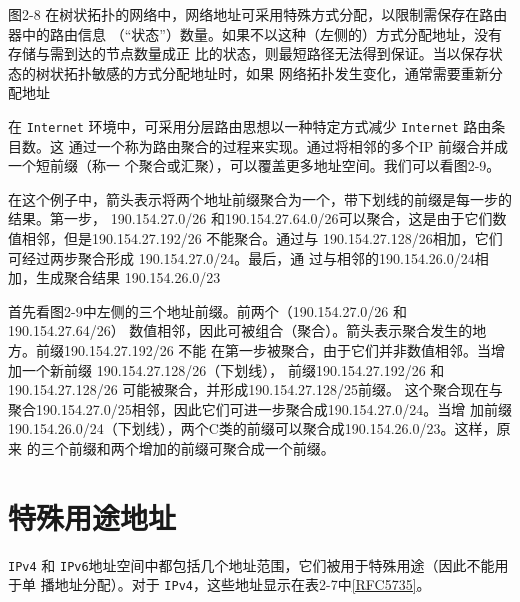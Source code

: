 图2-8 在树状拓扑的网络中，网络地址可采用特殊方式分配，以限制需保存在路由器中的路由信息
（“状态”）数量。如果不以这种（左侧的）方式分配地址，没有存储与需到达的节点数量成正
比的状态，则最短路径无法得到保证。当以保存状态的树状拓扑敏感的方式分配地址时，如果
网络拓扑发生变化，通常需要重新分配地址

在 \verb|Internet| 环境中，可采用分层路由思想以一种特定方式减少 \verb|Internet| 路由条目数。这
通过一个称为路由聚合的过程来实现。通过将相邻的多个IP 前缀合并成一个短前缀（称一
个聚合或汇聚），可以覆盖更多地址空间。我们可以看图2-9。

在这个例子中，箭头表示将两个地址前缀聚合为一个，带下划线的前缀是每一步的结果。第一步，
190.154.27.0/26 和190.154.27.64.0/26可以聚合，这是由于它们数值相邻，但是190.154.27.192/26
不能聚合。通过与 190.154.27.128/26相加，它们可经过两步聚合形成 190.154.27.0/24。最后，通
过与相邻的190.154.26.0/24相加，生成聚合结果 190.154.26.0/23

首先看图2-9中左侧的三个地址前缀。前两个（190.154.27.0/26 和 190.154.27.64/26）
数值相邻，因此可被组合（聚合）。箭头表示聚合发生的地方。前缀190.154.27.192/26 不能
在第一步被聚合，由于它们并非数值相邻。当增加一个新前缀 190.154.27.128/26（下划线），
前缀190.154.27.192/26 和190.154.27.128/26 可能被聚合，并形成190.154.27.128/25前缀。
这个聚合现在与聚合190.154.27.0/25相邻，因此它们可进一步聚合成190.154.27.0/24。当增
加前缀190.154.26.0/24（下划线），两个C类的前缀可以聚合成190.154.26.0/23。这样，原来
的三个前缀和两个增加的前缀可聚合成一个前缀。

\section{特殊用途地址}
\verb|IPv4| 和 \verb|IPv6|地址空间中都包括几个地址范围，它们被用于特殊用途（因此不能用于单
播地址分配）。对于 \verb|IPv4|，这些地址显示在表2-7中\href{https://www.rfc-editor.org/rfc/rfc5735}{[RFC5735]}。


